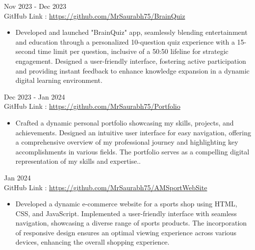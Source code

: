 \documentclass[letterpaper,10pt]{memoir} %
\begin{document}
\framebreak
\framebreak

\Sep


{Nov 2023 - Dec 2023}\\
{GitHub Link : \href{https://github.com/MrSaurabh75/BrainQuiz}{https://github.com/MrSaurabh75/BrainQuiz}}
\begin{itemize}
    \item Developed and launched "BrainQuiz" app, seamlessly blending entertainment and education through a personalized 10-question quiz experience with a 15-second time limit per question, inclusive of a 50:50 lifeline for strategic engagement. Designed a user-friendly interface, fostering active participation and providing instant feedback to enhance knowledge expansion in a dynamic digital learning environment.\\
\end{itemize}


{Dec 2023 - Jan 2024}\\
{GitHub Link : \href{https://github.com/MrSaurabh75/Portfolio}{https://github.com/MrSaurabh75/Portfolio}}
\begin{itemize}
    \item Crafted a dynamic personal portfolio showcasing my skills, projects, and achievements. Designed an intuitive user interface for easy navigation, offering a comprehensive overview of my professional journey and highlighting key accomplishments in various fields. The portfolio serves as a compelling digital representation of my skills and expertise..\\
\end{itemize}


{Jan 2024}\\
{GitHub Link : \href{https://github.com/MrSaurabh75/AMSportWebSite}{https://github.com/MrSaurabh75/AMSportWebSite}}
\begin{itemize}
    \item Developed a dynamic e-commerce website for a sports shop using HTML, CSS, and JavaScript. Implemented a user-friendly interface with seamless navigation, showcasing a diverse range of sports products. The incorporation of responsive design ensures an optimal viewing experience across various devices, enhancing the overall shopping experience.\\
\end{itemize}
\end{document}

